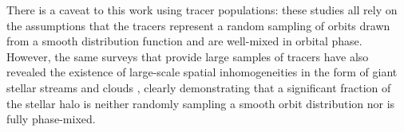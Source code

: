 \documentclass[preprint]{aastex}
\begin{document}
There is a caveat to this work using tracer populations: these studies all rely on the assumptions that the tracers  represent a random sampling of orbits drawn from a
smooth distribution function and are well-mixed in orbital phase.
However, the same surveys that provide large samples of tracers have also revealed the existence of large-scale spatial inhomogeneities in the form of giant stellar
streams and clouds \citep{newberg02,majewski03,belokurov06}, clearly demonstrating that  a significant fraction of the stellar halo is neither randomly sampling a smooth
orbit distribution nor is fully phase-mixed.
\end{document}
